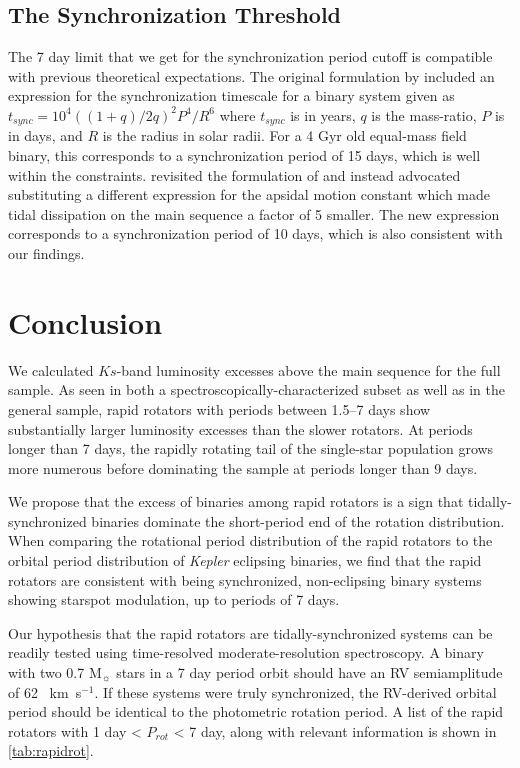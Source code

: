 \documentclass[twocolumn]{aastex6}
\newcommand{\Kepler}{\mbox{\textit{Kepler}}}
\newcommand{\kms}{\textrm{~km~s}\ensuremath{^{-1}}}
\begin{document}
\subsection{The Synchronization Threshold}

The 7 day limit that we get for the synchronization period cutoff is compatible
with previous theoretical expectations. The original formulation by
\citet{Zahn77} included an expression for the synchronization timescale for a
binary system given as \(t_{sync} = 10^4 ((1+q)/2q)^2 P^4 / R^6\) where \(t_{sync}\) is
in years, \(q\) is the mass-ratio, \(P\) is in days, and \(R\) is the radius in
solar radii. For a 4 Gyr old equal-mass field binary, this
corresponds to a synchronization period of 15 days, which is well within the
constraints. \citet{Claret97} revisited the formulation of \citet{Zahn77} and
instead advocated substituting a different expression for the apsidal motion 
constant which made tidal dissipation on the main sequence a factor of 5
smaller. The new expression corresponds to a synchronization period of 10 days,
which is also consistent with our findings.


\section{Conclusion}
\label{sec:conclusions}

We calculated \(Ks\)-band luminosity excesses above the main sequence for the full
\citet{McQuillan14} sample. As seen in both a spectroscopically-characterized
subset as well as in the general sample, rapid rotators with periods between
1.5--7 days show substantially larger luminosity excesses than the slower
rotators. At periods longer than 7 days, the rapidly rotating tail of the
single-star population grows more numerous before dominating the sample at
periods longer than 9 days. 

We propose that the excess of binaries among rapid rotators is a sign that
tidally-synchronized binaries dominate the short-period end of the rotation
distribution. When comparing the rotational period distribution of the rapid 
rotators to the orbital period distribution of \Kepler{} eclipsing binaries, we
find that the rapid rotators are consistent with being synchronized, 
non-eclipsing binary systems showing starspot modulation, up to periods of 7
days.

Our hypothesis that the rapid rotators are tidally-synchronized systems can be
readily tested using time-resolved moderate-resolution spectroscopy. A binary
with two 0.7 M\(_\sun\) stars in a 7 day period orbit should have an RV
semiamplitude of 62 \kms. If these systems were truly synchronized, the
RV-derived orbital period should be identical to the photometric rotation
period. A list of the rapid rotators with 1 day < \(P_{rot}\) < 7 day, along
with relevant information is shown in \cref{tab:rapidrot}.
\end{document}
